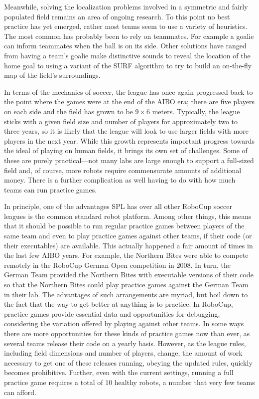 \documentclass{llncs}
\begin{document}
Meanwhile, solving the localization problems involved in a symmetric 
and fairly populated 
field remains an area of ongoing research. To this point no best
practice has yet emerged, rather most teams seem to use a variety of
heuristics. The most common has probably been to rely on teammates. For
example a goalie can inform teammates when the ball is on its side.
Other solutions have ranged from having a team's goalie make
distinctive sounds to reveal the location of the home goal to using a variant of the SURF algorithm to try
to build an on-the-fly map of the field's surroundings.

In terms of the mechanics of soccer, the league has once again progressed
back to the point where the games were at
the end of the AIBO era; there are five players on each side and the field has grown to be $9\times 6$ meters. Typically,
the league sticks with a given field size and number of
players for approximately two to three years, so it is likely that the league
will look to use larger fields with more players in the next year. While this
growth represents important progress towards the ideal of playing
on human fields, it brings its own set of challenges. Some of these are
purely practical---not many labs are large enough to support a full-sized
field and, of course, more robots require commensurate amounts of additional
money. There is a further complication as well having to do with how
much teams can run practice games. 

In principle, one of the
advantages SPL has over all other RoboCup soccer
leagues is the common standard robot platform. Among other things, this
means that it should be possible to run regular practice games between players of the same team and even
to play practice games against other teams, if their code (or their executables) are available. This actually happened a fair amount of times in the last few
AIBO years. For example, the Northern Bites were able to compete remotely
in the RoboCup German Open competition in 2008. In turn, the German Team provided the
Northern Bites with executable versions of their code so that the Northern
Bites could play practice games against the German Team in their lab. The advantages of
such arrangements are myriad, but boil down to the fact that the way to
get better at anything is to practice. In RoboCup, practice games provide
essential data and opportunities for debugging, considering the variation offered by playing
against other teams. In some
ways there are more opportunities for these kinds of practice games now than
ever, as several teams release their code on a yearly
basis. However, as the league rules, including field dimensions and number of players, change, the amount of work necessary to get
one of these releases running, obeying the updated rules, quickly becomes prohibitive.
Further, even with the current settings, running a full practice game requires a total of 10 healthy robots, a number
that very few teams can afford.
\end{document}
